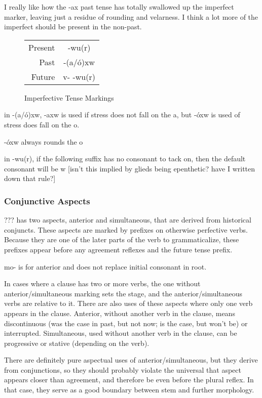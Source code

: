 \documentclass[12pt]{book} %
\begin{document}
{\color{red}I really like how the -ax past tense has totally swallowed up the imperfect marker, leaving just a residue of rounding and velarness.
I think a lot more of the imperfect should be present in the non-past.
}

\begin{figure}[H]
\centering
	\begin{tabular}{rc}
		Present	& -wu(r)		\\
		Past		&  -(a/ó)xw	\\
		Future	& v- -wu(r)	\\
	\end{tabular}
\caption{Imperfective Tense Markings}\label{t:imperfective-tense}
\end{figure}

{\color{cyan}
in -(a/ó)xw, -axw is used if stress does not fall on the a, but -óxw is used of stress does fall on the o.

-óxw always rounds the o

in -wu(r), if the following suffix has no consonant to tack on, then the default consonant will be w {\color{red}[isn't this implied by glieds being epenthetic? have I written down that rule?]}
}

\subsubsection{Conjunctive Aspects}

??? has two aspects, anterior and simultaneous, that are derived from historical conjuncts.
These aspects are marked by prefixes on otherwise perfective verbs.
Because they are one of the later parts of the verb to grammaticalize, these prefixes appear before any agreement reflexes and the future tense prefix.

{\color{orange}
mo- is for anterior and does not replace initial consonant in root.
}

{\color{cyan}
In cases where a clause has two or more verbs, the one without anterior/simultaneous marking sets the stage, and the anterior/simultaneous verbs are relative to it.
There are also uses of these aspects where only one verb appears in the clause.
{\color{orange}
Anterior, without another verb in the clause, means discontinuous (was the case in past, but not now; is the case, but won't be) or interrupted.
Simultaneous, used without another verb in the clause, can be progressive or stative (depending on the verb).
}
}

{\color{green}
There are definitely pure aspectual uses of anterior/simultaneous, but they derive from conjunctions, so they should probably violate the universal that aspect appears closer than agreement, and therefore be even before the plural reflex. In that case, they serve as a good boundary between stem and further morphology.
}
\end{document}
